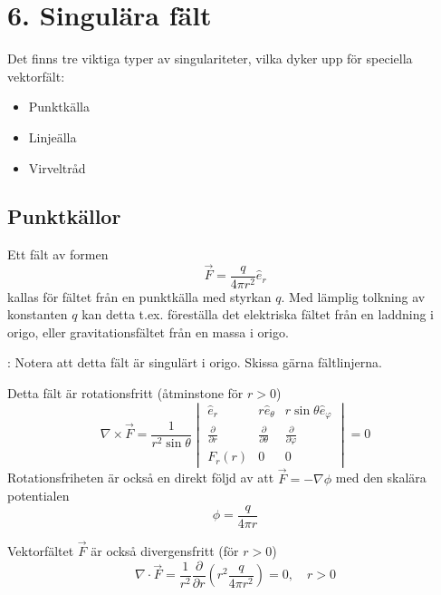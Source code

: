 \documentclass[%
oneside,                 %
final,                   %
10pt]{article}
\newcommand{\shortinlinecomment}[3]{{\color{red}{\bf #1}: #2}}
\begin{document}
\section{6. Singulära fält}

Det finns tre viktiga typer av singulariteter, vilka dyker upp för speciella vektorfält:

\begin{itemize}
\item Punktkälla 

\item Linjeälla 

\item Virveltråd
\end{itemize}

\noindent
\subsection{Punktkällor}

Ett fält av formen 
\begin{equation}
  \vec{F} = \frac{q}{4 \pi r^2}\hat{e}_{r}
\end{equation}
kallas för fältet från en punktkälla med styrkan $q$. Med lämplig tolkning av konstanten $q$ kan detta t.ex. föreställa det elektriska fältet från en laddning i origo, eller gravitationsfältet från en massa i origo.  

\shortinlinecomment{Comment 1}{ Notera att detta fält är singulärt i origo. Skissa gärna fältlinjerna. }{ Notera att detta fält }

Detta fält är rotationsfritt (åtminstone för $r>0$)
\begin{equation}
\nabla\times\vec F = \frac{1}{r^2\sin\theta}
\begin{vmatrix}
\hat{e}_r&r\hat{e}_\theta&r\sin\theta\hat{e}_\varphi \\ 


\frac{\partial}{\partial r}&
\frac{\partial}{\partial \theta}&
\frac{\partial}{\partial \varphi} \\ 
F_r(r)&0&0
\end{vmatrix}=0
\end{equation}
Rotationsfriheten är också en direkt följd av att $\vec F = - \nabla \phi$ med den skalära potentialen 
\begin{equation}
\phi=\frac{q}{4\pi r}
\end{equation}

Vektorfältet $\vec F$ är också divergensfritt (för $r>0$)
\begin{equation}
\nabla\cdot\vec F=\frac{1}{r^2}
 \frac{\partial}{\partial r}\left(r^2 \frac{q}{4\pi
r^2}\right)=0, \quad r>0
\end{equation}
\end{document}
